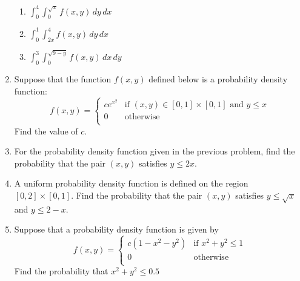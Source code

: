 \documentclass{article}
\begin{document}
\begin{enumerate}
\begin{enumerate}
         \item $\displaystyle \int_0^4\int_{0}^{\sqrt{x}} f(x,y)\,dy\,dx$
         \item $\displaystyle \int_0^1\int_{2x}^4 f(x,y)\,dy\,dx$
        \item $\displaystyle \int_0^3\int_0^{\sqrt{9-y}}f(x,y)\,dx\,dy$
        \end{enumerate}
        \item Suppose that the function $f(x,y)$ defined below is a probability density function:
        $$ f(x,y) = \begin{cases} 
            ce^{x^2} & \text{if } (x,y) \in [0,1]\times [0,1] \text{ and } y \leq x\\
            0 & \text{otherwise} \\
            \end{cases}
        $$
        Find the value of $c$.
        \item For the probability density function given in the previous problem, find the probability that the pair $(x,y)$ satisfies $y \leq 2x$.
        \item A uniform probability density function is defined on the region $[0,2]\times[0,1]$. Find the probability that the pair $(x,y)$ satisfies $y \leq \sqrt{x}$ and $y \leq 2-x$.
       
       \item Suppose that a probability density function is given by 
       $$ f(x,y) = \begin{cases} 
            c(1-x^2-y^2) & \text{if } x^2+y^2\leq 1 \\
            0 & \text{otherwise} \\
            \end{cases}
        $$
        Find the probability that $x^2+y^2 \leq 0.5$

                \end{enumerate}
\end{document}
